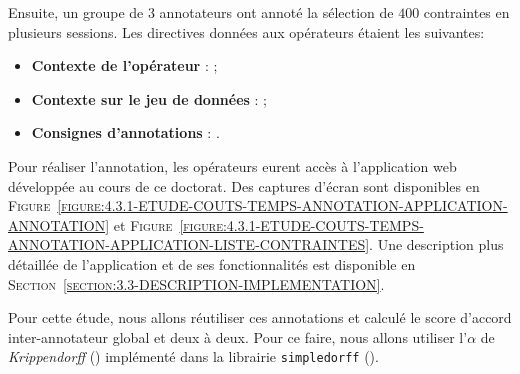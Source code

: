 			Ensuite, un groupe de $3$ annotateurs ont annoté la sélection de $400$ contraintes en plusieurs sessions.
			Les directives données aux opérateurs étaient les suivantes:
			\begin{itemize}
				\item \textbf{Contexte de l'opérateur} :
				 ;
				\item \textbf{Contexte sur le jeu de données} :
				 ;
				\item \textbf{Consignes d'annotations} :
				.
			\end{itemize}
			Pour réaliser l'annotation, les opérateurs eurent accès à l'application web développée au cours de ce doctorat.
			Des captures d'écran sont disponibles en \textsc{Figure~\ref{figure:4.3.1-ETUDE-COUTS-TEMPS-ANNOTATION-APPLICATION-ANNOTATION}} et \textsc{Figure~\ref{figure:4.3.1-ETUDE-COUTS-TEMPS-ANNOTATION-APPLICATION-LISTE-CONTRAINTES}}.
			Une description plus détaillée de l'application et de ses fonctionnalités est disponible en \textsc{Section~\ref{section:3.3-DESCRIPTION-IMPLEMENTATION}}.
			
			Pour cette étude, nous allons réutiliser ces annotations et calculé le score d'accord inter-annotateur global et deux à deux.
			Pour ce faire, nous allons utiliser l'$\alpha$ de \textit{Krippendorff} (\cite{krippendorff:2004:content-analysis-introduction}) implémenté dans la librairie \texttt{simpledorff} (\cite{perry:2021:lighttag-text-annotation}).
			
